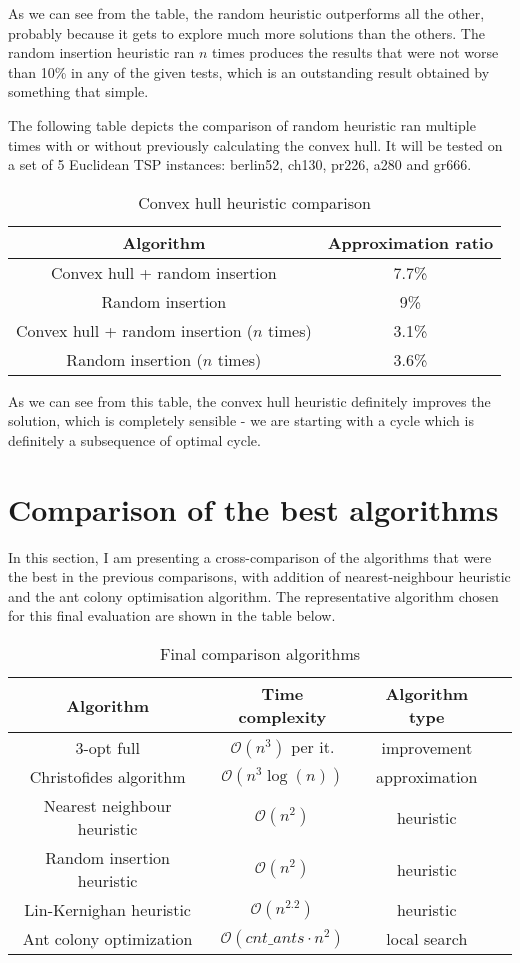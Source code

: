 \documentclass[12pt,twoside,notitlepage]{report}
\begin{document}
As we can see from the table, the random heuristic outperforms all the other, probably because it gets to explore much more solutions than the others. The random insertion heuristic ran $n$ times produces the results that were not worse than 10\% in any of the given tests, which is an outstanding result obtained by something that simple.

The following table depicts the  comparison of random heuristic ran multiple times with or without previously calculating the convex hull. It will be tested on a set of 5 Euclidean TSP instances: berlin52, ch130, pr226, a280 and gr666.

\begin{table}[h!]
\centering
\begin{tabular}{||c || c ||} 
 \hline
 Algorithm & Approximation ratio \\ [0.5ex] 
 \hline\hline
 Convex hull + random insertion &  7.7\% \\
 Random insertion & 9\% \\
 Convex hull + random insertion ($n$ times) &  3.1\% \\
 Random insertion ($n$ times) & 3.6\% \\
 \hline
\end{tabular}
\caption{Convex hull heuristic comparison}
\label{comparison:6}
\end{table}

As we can see from this table, the convex hull heuristic definitely improves the solution, which is completely sensible - we are starting with a cycle which is definitely a subsequence of optimal cycle.

\section{Comparison of the best algorithms}

In this section, I am presenting a cross-comparison of the algorithms that were the best in the previous comparisons, with addition of nearest-neighbour heuristic and the ant colony optimisation algorithm. The representative algorithm chosen for this final evaluation are shown in the table below.

\begin{table}[h!]
\centering
\begin{tabular}{||c | c | c | c||} 
 \hline
 Algorithm & Time complexity & Algorithm type \\ [0.5ex] 
 \hline\hline
 $3$-opt full & $\mathcal{O}(n^3)$ per it. & improvement \\
 Christofides algorithm & $\mathcal{O}(n^3 \log(n))$ & approximation \\
 Nearest neighbour heuristic & $\mathcal{O}(n^2) $ & heuristic \\
 Random insertion heuristic & $\mathcal{O}(n^2)$ & heuristic \\
 Lin-Kernighan heuristic & $\mathcal{O}(n^2.2)$ & heuristic \\
 Ant colony optimization & $\mathcal{O}(cnt\_ants \cdot n^2)$ & local search \\
 \hline
\end{tabular}
\caption{Final comparison algorithms}
\label{table:5}
\end{table}
\end{document}
